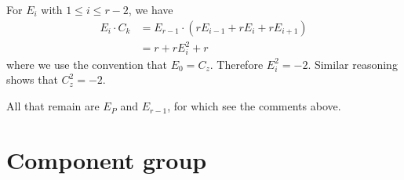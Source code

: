 \documentclass{article}
\theoremstyle{plain}
\theoremstyle{definition}
\theoremstyle{remark}
\begin{document}
For $E_{i}$ with $1 \leq i \leq r-2$, we have
\begin{align*}
  E_{i} \cdot C_k &= E_{r-1} \cdot (rE_{i-1} + rE_{i} + rE_{i+1}) \\
  &= r + rE_i^2 + r
\end{align*}
where we use the convention that $E_0 = C_z$. Therefore $E_i^2 = -2$. Similar reasoning shows that $C_z^2 = -2$.

All that remain are $E_P$ and $E_{r-1}$, for which see the comments above.

\section{Component group}
\label{sec:component-group}





\end{document}
